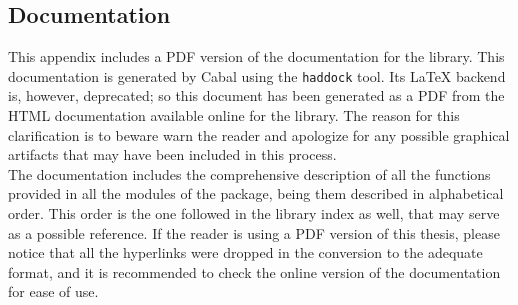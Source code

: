 \begin{appendices}

\section{Documentation}

This appendix includes a PDF version of the documentation for the library. This
documentation is generated by Cabal using the \texttt{haddock} tool. Its LaTeX
backend is, however, deprecated; so this document has been generated as a PDF
from the HTML documentation available online for the library. The reason for
this clarification is to beware warn the reader and apologize for any possible
graphical artifacts that may have been included in this process.\\

The documentation includes the comprehensive description of all the functions
provided in all the modules of the package, being them described in
alphabetical order. This order is the one followed in the library index as
well, that may serve as a possible reference. If the reader is using a PDF
version of this thesis, please notice that all the hyperlinks were dropped in
the conversion to the adequate format, and it is recommended to check the
online version of the documentation for ease of use.\\



\end{appendices}
